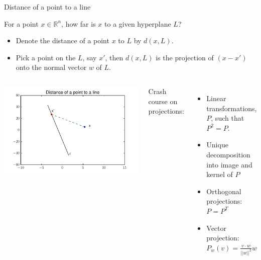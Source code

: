 \documentclass{beamer}
\begin{document}
\begin{frame}{Distance of a point to a line}

For a point $x \in \mathbb{R}^n$, how far is $x$ to a given hyperplane $L$?
\begin{itemize}
    \item Denote the distance of a point $x$ to $L$ by $d(x,L)$.
    \item Pick a point on the $L$, say $x'$, then $d(x,L)$ is the projection of $(x-x')$ onto the normal vector $w$ of $L$.
\end{itemize}

\begin{columns}
\includegraphics[scale=0.4225]{figures/proj.pdf}

Crash course on projections:
\begin{itemize}
    \item Linear transformations, $P$, such that $P^2=P$.
    \item Unique decomposition into image and kernel of $P$
    \item Orthogonal projections: $P=P^T$
    \item Vector projection: $P_w(v)=\frac{v\cdot w}{||w||^2}w$
\end{itemize}
\end{columns}
    
\end{frame}

\end{document}
